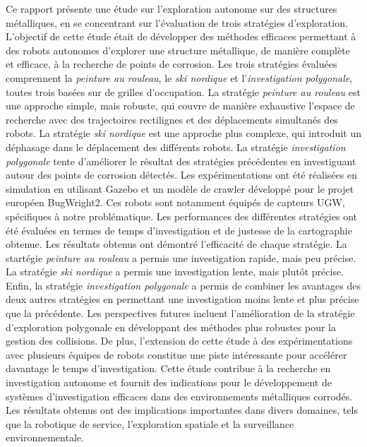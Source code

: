 \documentclass[francais,RandD]{rapportPFE}
\begin{document}
\begin{ResumeMotsCles}
\begin{resumeEn}
{			}
		\end{resumeEn}
		\begin{resumeFr}
			{\scriptsize
				Ce rapport présente une étude sur l'exploration autonome sur des structures métalliques, en se concentrant sur l'évaluation de trois stratégies d'exploration. L'objectif de cette étude était de développer des méthodes efficaces permettant à des robots autonomes d'explorer une structure métallique, de manière complète et efficace, à la recherche de points de corrosion.
				Les trois stratégies évaluées comprennent la \textit{peinture au rouleau}, le \textit{ski nordique} et l'\textit{investigation polygonale}, toutes trois basées sur de grilles d'occupation.
				La stratégie \textit{peinture au rouleau} est une approche simple, mais robuste, qui couvre de manière exhaustive l'espace de recherche avec des trajectoires rectilignes et des déplacements simultanés des robots.
				La stratégie \textit{ski nordique} est une approche plus complexe, qui introduit un déphasage dans le déplacement des différents robots.
				La stratégie \textit{investigation polygonale} tente d'améliorer le résultat des stratégies précédentes en investiguant autour des points de corrosion détectés.
				Les expérimentations ont été réalisées en simulation en utilisant Gazebo et un modèle de crawler développé pour le projet européen BugWright2.
				Ces robots sont notamment équipés de capteurs UGW, spécifiques à notre problématique.
				Les performances des différentes stratégies ont été évaluées en termes de temps d'investigation et de justesse de la cartographie obtenue.
				Les résultats obtenus ont démontré l'efficacité de chaque stratégie.
				La startégie \textit{peinture au rouleau} a permis une investigation rapide, mais peu précise. La stratégie \textit{ski nordique} a permis une investigation lente, mais plutôt précise.
				Enfin, la stratégie \textit{investigation polygonale} a permis de combiner les avantages des deux autres stratégies en permettant une investigation moins lente et plus précise que la précédente.
				Les perspectives futures incluent l'amélioration de la stratégie d'exploration polygonale en développant des méthodes plus robustes pour la gestion des collisions.
				De plus, l'extension de cette étude à des expérimentations avec plusieurs équipes de robots constitue une piste intéressante pour accélérer davantage le temps d'investigation.
				Cette étude contribue à la recherche en investigation autonome et fournit des indications pour le développement de systèmes d'investigation efficaces dans des environnements métalliques corrodés.
				Les résultats obtenus ont des implications importantes dans divers domaines, tels que la robotique de service, l'exploration spatiale et la surveillance environnementale.
			}
		\end{resumeFr}
	\end{ResumeMotsCles}
\end{document}
